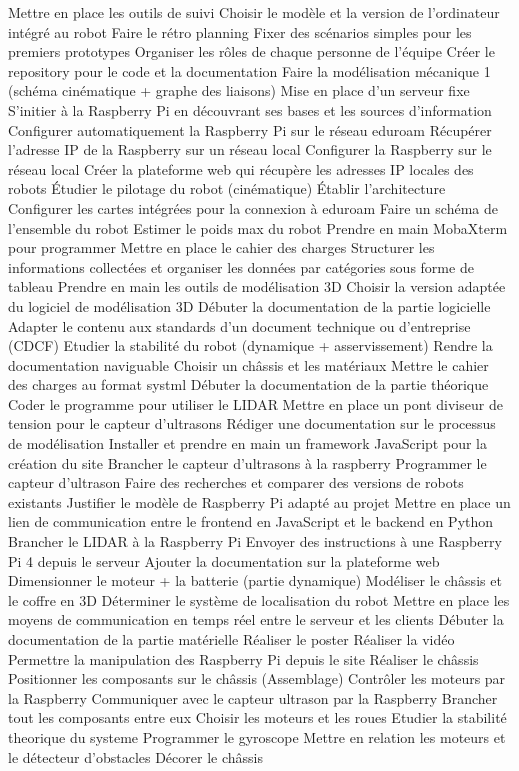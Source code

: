 \documentclass[a4paper,12pt]{report}  %
\begin{document}
	Mettre en place les outils de suivi
	Choisir le modèle et la version de l'ordinateur intégré au robot
	Faire le rétro planning
	Fixer des scénarios simples pour les premiers prototypes
	Organiser les rôles de chaque personne de l'équipe
	Créer le repository pour le code et la documentation
	Faire la modélisation mécanique 1 (schéma cinématique + graphe des liaisons)
	Mise en place d'un serveur fixe 
	S’initier à la Raspberry Pi en découvrant ses bases et les sources d'information
	Configurer automatiquement la Raspberry Pi sur le réseau eduroam 
	Récupérer l'adresse IP de la Raspberry sur un réseau local
	Configurer la Raspberry sur le réseau local
	Créer la plateforme web qui récupère les adresses IP locales des robots
	Étudier le pilotage du robot (cinématique)
	Établir l'architecture
	Configurer les cartes intégrées pour la connexion à eduroam 
	Faire un schéma de l'ensemble du robot 
	Estimer le poids max du robot 
	Prendre en main MobaXterm pour programmer
	Mettre en place le cahier des charges
	Structurer les informations collectées et organiser les données par catégories sous forme de tableau
	Prendre en main les outils de modélisation 3D
	Choisir la version adaptée du logiciel de modélisation 3D
	Débuter la documentation de la partie logicielle
	Adapter le contenu aux standards d’un document technique ou d’entreprise (CDCF)
	Etudier la stabilité du robot (dynamique + asservissement)
	Rendre la documentation naviguable
	Choisir un châssis et les matériaux
	Mettre le cahier des charges au format systml
	Débuter la documentation de la partie théorique
	Coder le programme pour utiliser le LIDAR
	Mettre en place un pont diviseur de tension pour le capteur d'ultrasons
	Rédiger une documentation sur le processus de modélisation 
	Installer et prendre en main un framework JavaScript pour la création du site 
	Brancher le capteur d'ultrasons à la raspberry
	Programmer le capteur d'ultrason
	Faire des recherches et comparer des versions de robots existants
	Justifier le modèle de Raspberry Pi adapté au projet
	Mettre en place un lien de communication entre le frontend en JavaScript et le backend en Python
	Brancher le LIDAR à la Raspberry Pi
	Envoyer des instructions à une Raspberry Pi 4 depuis le serveur
	Ajouter la documentation sur la plateforme web
	Dimensionner le moteur + la batterie (partie dynamique)
	Modéliser le châssis et le coffre en 3D
	Déterminer le système de localisation du robot
	Mettre en place les moyens de communication en temps réel entre le serveur et les clients
	Débuter la documentation de la partie matérielle
	Réaliser le poster
	Réaliser la vidéo
	Permettre la manipulation des Raspberry Pi depuis le site
	Réaliser le châssis
	Positionner les composants sur le châssis (Assemblage)
	Contrôler les moteurs par la Raspberry
	Communiquer avec le capteur ultrason par la Raspberry
	Brancher tout les composants entre eux
	Choisir les moteurs et les roues
	Etudier la stabilité theorique du systeme 
	Programmer le gyroscope
	Mettre en relation les moteurs et le détecteur d'obstacles
	Décorer le châssis
	
\end{document}
